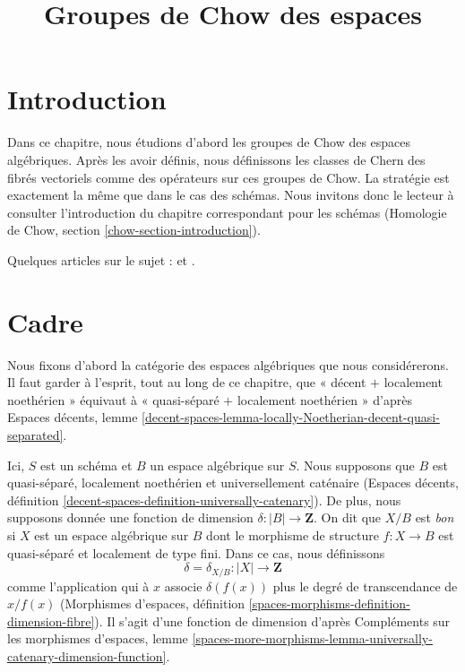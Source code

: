 

%


\title{Groupes de Chow des espaces}

\maketitle

\label{section-phantom}


\tableofcontents


\section{Introduction}
\label{section-introduction}

\noindent
Dans ce chapitre, nous étudions d'abord les groupes de Chow des espaces
algébriques. Après les avoir définis, nous définissons les classes de Chern des
fibrés vectoriels comme des opérateurs sur ces groupes de Chow. La stratégie
est exactement la même que dans le cas des schémas. Nous invitons donc le
lecteur à consulter l'introduction du chapitre correspondant pour les schémas
(Homologie de Chow, section \ref{chow-section-introduction}).

\medskip\noindent
Quelques articles sur le sujet : \cite{edidin-graham} et \cite{kresch_cycle}.



\section{Cadre}
\label{section-setup}

\noindent
Nous fixons d'abord la catégorie des espaces algébriques que nous considérerons.
Il faut garder à l'esprit, tout au long de ce chapitre, que
« décent $+$ localement noethérien » équivaut à « quasi-séparé $+$ localement
noethérien » d'après Espaces décents, lemme
\ref{decent-spaces-lemma-locally-Noetherian-decent-quasi-separated}.

\begin{situation}
\label{situation-setup}
Ici, $S$ est un schéma et $B$ un espace algébrique sur $S$. Nous supposons
que $B$ est quasi-séparé, localement noethérien et universellement caténaire
(Espaces décents, définition
\ref{decent-spaces-definition-universally-catenary}). De plus, nous supposons
donnée une fonction de dimension $\delta : |B| \longrightarrow
\mathbf{Z}$. On dit que $X/B$ est {\it bon} si $X$ est un espace algébrique
sur $B$ dont le morphisme de structure $f : X \to B$ est quasi-séparé et
localement de type fini. Dans ce cas, nous définissons
$$
\delta = \delta_{X/B} : |X| \longrightarrow \mathbf{Z}
$$
comme l'application qui à $x$ associe $\delta(f(x))$ plus le degré de
transcendance de $x/f(x)$ (Morphismes d'espaces, définition
\ref{spaces-morphisms-definition-dimension-fibre}). Il s'agit d'une fonction
de dimension d'après Compléments sur les morphismes d'espaces, lemme
\ref{spaces-more-morphisms-lemma-universally-catenary-dimension-function}.
\end{situation}

